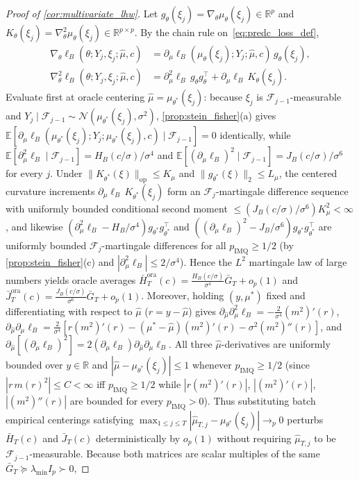\documentclass[11pt,a4paper,reqno]{amsart}
\theoremstyle{definition}
\theoremstyle{remark}
\newcommand{\R}{\mathbb{R}}
\newcommand{\E}{\mathbb{E}}
\newcommand{\Ncal}{\mathcal{N}}
\begin{document}
\begin{proof}[Proof of \cref{cor:multivariate_lhw}]
Let $g_\theta(\xi_j) = \nabla_\theta \mu_\theta(\xi_j) \in \R^p$ and $K_\theta(\xi_j) = \nabla_\theta^2 \mu_\theta(\xi_j) \in \R^{p \times p}$. By the chain rule on~\eqref{eq:predc_loss_def},
\begin{align*}
\nabla_\theta \ell_B(\theta; Y_j, \xi_j; \hat{\mu}, c) &= \partial_\mu \ell_B(\mu_\theta(\xi_j); Y_j; \hat{\mu}, c)\,g_\theta(\xi_j), \\
\nabla_\theta^2 \ell_B(\theta; Y_j, \xi_j; \hat{\mu}, c) &= \partial_\mu^2 \ell_B\,g_\theta g_\theta^\top + \partial_\mu \ell_B\,K_\theta(\xi_j).
\end{align*}
Evaluate first at oracle centering $\hat{\mu} = \mu_{\theta^*}(\xi_j)$: because $\xi_j$ is $\mathcal{F}_{j-1}$-measurable and $Y_j \mid \mathcal{F}_{j-1} \sim \Ncal(\mu_{\theta^*}(\xi_j), \sigma^2)$, \cref{prop:stein_fisher}(a) gives $\E[\partial_\mu \ell_B(\mu_{\theta^*}(\xi_j); Y_j; \mu_{\theta^*}(\xi_j), c) \mid \mathcal{F}_{j-1}] = 0$ identically, while $\E[\partial_\mu^2 \ell_B \mid \mathcal{F}_{j-1}] = H_B(c/\sigma)/\sigma^4$ and $\E[(\partial_\mu \ell_B)^2 \mid \mathcal{F}_{j-1}] = J_B(c/\sigma)/\sigma^6$ for every $j$. Under $\|K_{\theta^*}(\xi)\|_{\mathrm{op}} \le K_\mu$ and $\|g_{\theta^*}(\xi)\|_2 \le L_\mu$, the centered curvature increments $\partial_\mu \ell_B\,K_{\theta^*}(\xi_j)$ form an $\mathcal{F}_j$-martingale difference sequence with uniformly bounded conditional second moment $\le (J_B(c/\sigma)/\sigma^6) K_\mu^2 < \infty$, and likewise $(\partial_\mu^2 \ell_B - H_B/\sigma^4)g_{\theta^*}g_{\theta^*}^\top$ and $((\partial_\mu \ell_B)^2 - J_B/\sigma^6)g_{\theta^*}g_{\theta^*}^\top$ are uniformly bounded $\mathcal{F}_j$-martingale differences for all $p_{\mathrm{IMQ}} \ge 1/2$ (by \cref{prop:stein_fisher}(c) and $|\partial_\mu^2 \ell_B| \le 2/\sigma^4$). Hence the $L^2$ martingale law of large numbers yields oracle averages $\bar{H}_T^{\mathrm{ora}}(c) = \frac{H_B(c/\sigma)}{\sigma^4}\bar{G}_T + o_p(1)$ and $\bar{J}_T^{\mathrm{ora}}(c) = \frac{J_B(c/\sigma)}{\sigma^6}\bar{G}_T + o_p(1)$. Moreover, holding $(y, \mu^*)$ fixed and differentiating with respect to $\hat{\mu}$ ($r = y - \hat{\mu}$) gives $\partial_{\hat{\mu}} \partial_\mu^2 \ell_B = -\frac{2}{\sigma^4}(m^2)'(r)$, $\partial_{\hat{\mu}} \partial_\mu \ell_B = \frac{2}{\sigma^4}[r(m^2)'(r) - (\mu^* - \hat{\mu})(m^2)'(r) - \sigma^2 (m^2)''(r)]$, and $\partial_{\hat{\mu}}[(\partial_\mu \ell_B)^2] = 2(\partial_\mu \ell_B)\partial_{\hat{\mu}}\partial_\mu \ell_B$. All three $\hat{\mu}$-derivatives are uniformly bounded over $y \in \R$ and $|\hat{\mu} - \mu_{\theta^*}(\xi_j)| \le 1$ whenever $p_{\mathrm{IMQ}} \ge 1/2$ (since $|r\,m(r)^2| \le C < \infty$ iff $p_{\mathrm{IMQ}} \ge 1/2$ while $|r(m^2)'(r)|$, $|(m^2)'(r)|$, $|(m^2)''(r)|$ are bounded for every $p_{\mathrm{IMQ}} > 0$). Thus substituting batch empirical centerings satisfying $\max_{1\le j\le T}|\hat{\mu}_{T,j} - \mu_{\theta^*}(\xi_j)| \to_p 0$ perturbs $\bar{H}_T(c)$ and $\bar{J}_T(c)$ deterministically by $o_p(1)$ without requiring $\hat{\mu}_{T,j}$ to be $\mathcal{F}_{j-1}$-measurable. Because both matrices are scalar multiples of the same $\bar{G}_T \succeq \lambda_{\min} I_p \succ 0$, 
\end{proof}
\end{document}
